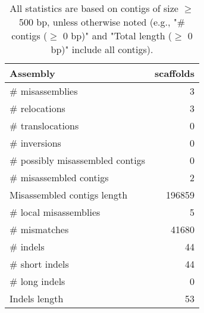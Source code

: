 \documentclass[12pt,a4paper]{article}
\begin{document}
\begin{table}[ht]
\begin{center}
\caption{All statistics are based on contigs of size $\geq$ 500 bp, unless otherwise noted (e.g., "\# contigs ($\geq$ 0 bp)" and "Total length ($\geq$ 0 bp)" include all contigs).}
\begin{tabular}{|l*{1}{|r}|}
\hline
Assembly & scaffolds \\ \hline
\# misassemblies & 3 \\ \hline
\hspace{5mm}\# relocations & 3 \\ \hline
\hspace{5mm}\# translocations & 0 \\ \hline
\hspace{5mm}\# inversions & 0 \\ \hline
\# possibly misassembled contigs & 0 \\ \hline
\# misassembled contigs & 2 \\ \hline
Misassembled contigs length & 196859 \\ \hline
\# local misassemblies & 5 \\ \hline
\# mismatches & 41680 \\ \hline
\# indels & 44 \\ \hline
\hspace{5mm}\# short indels & 44 \\ \hline
\hspace{5mm}\# long indels & 0 \\ \hline
Indels length & 53 \\ \hline
\end{tabular}
\end{center}
\end{table}
\end{document}
